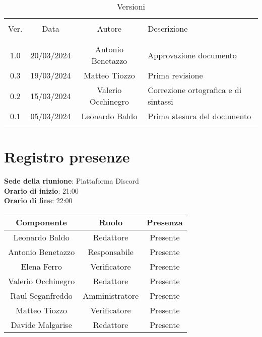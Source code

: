 \documentclass[italian,12pt]{article} %
\begin{document}


\newpage





\begin{table}[!h]
	\caption{Versioni}
	\begin{center}
		\begin{tabular}{ c c c p{9cm}}
			\hline \\[-2ex]
			Ver. & Data & Autore & Descrizione \\
			\\[-2ex] \hline \\[-1.5ex]
			1.0 & 20/03/2024 & Antonio Benetazzo & Approvazione documento \\
			0.3 & 19/03/2024 & Matteo Tiozzo & Prima revisione \\
			0.2 & 15/03/2024 & Valerio Occhinegro& Correzione ortografica e di sintassi  \\
			0.1 & 05/03/2024 & Leonardo Baldo& Prima stesura del documento\\
			\\[-1.5ex] \hline
		\end{tabular}
	\end{center}
\end{table}
\newpage

\tableofcontents

\newpage

\section{Registro presenze}


\textbf{Sede della riunione}: Piattaforma Discord\\
\textbf{Orario di inizio}: 21:00\\
\textbf{Orario di fine}: 22:00\\


\begin{flushleft}
	\begin{table}[!h]
	\begin{tabular}{ |c|c|c| } 
		\hline
		\textbf{Componente} & \textbf{Ruolo} & \textbf{Presenza} \\
		\hline 
		Leonardo Baldo 		& Redattore & Presente \\ 
		Antonio Benetazzo 	& Responsabile & Presente \\
		Elena Ferro 		& Verificatore & Presente \\
		Valerio Occhinegro 	& Redattore & Presente \\
		Raul Seganfreddo 	& Amministratore & Presente \\
		Matteo Tiozzo 		& Verificatore & Presente \\ 
		Davide Malgarise 	& Redattore & Presente \\
		\hline
	\end{tabular}
	\end{table}
	\end{flushleft}
\end{document}
